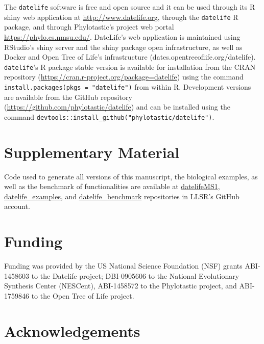 \documentclass[
  english,
  man]{apa6}
\begin{document}
The \texttt{datelife} software is free and open source and it can be used through its R shiny web application at
\url{http://www.datelife.org}, through the \texttt{datelife} R package, and through Phylotastic's project web portal \url{https://phylo.cs.nmsu.edu/}.
DateLife's web application is maintained using RStudio's shiny server and the shiny package open infrastructure, as well as Docker and Open Tree of Life's infrastructure (dates.opentreeoflife.org/datelife).
\texttt{datelife}'s R package stable version is available
for installation from the CRAN repository (\url{https://cran.r-project.org/package=datelife})
using the command \texttt{install.packages(pkgs\ =\ "datelife")} from within R. Development versions
are available from the GitHub repository (\url{https://github.com/phylotastic/datelife})
and can be installed using the command \texttt{devtools::install\_github("phylotastic/datelife")}.

\hypertarget{supplementary-material}{%
\section{Supplementary Material}\label{supplementary-material}}

Code used to generate all versions of this manuscript, the biological examples, as well as the benchmark of functionalities are available at \href{https://github.com/LunaSare/datelifeMS1}{datelifeMS1}, \href{https://github.com/LunaSare/datelife_examples}{datelife\_examples}, and \href{https://github.com/LunaSare/datelife_benchmark}{datelife\_benchmark} repositories in LLSR's GitHub account.

\hypertarget{funding}{%
\section{Funding}\label{funding}}

Funding was provided by the US National Science Foundation (NSF) grants ABI-1458603 to the Datelife project; DBI-0905606 to the National Evolutionary Synthesis Center (NESCent), ABI-1458572 to the Phylotastic project, and ABI-1759846 to the Open Tree of Life project.

\hypertarget{acknowledgements}{%
\section{Acknowledgements}\label{acknowledgements}}
\end{document}
